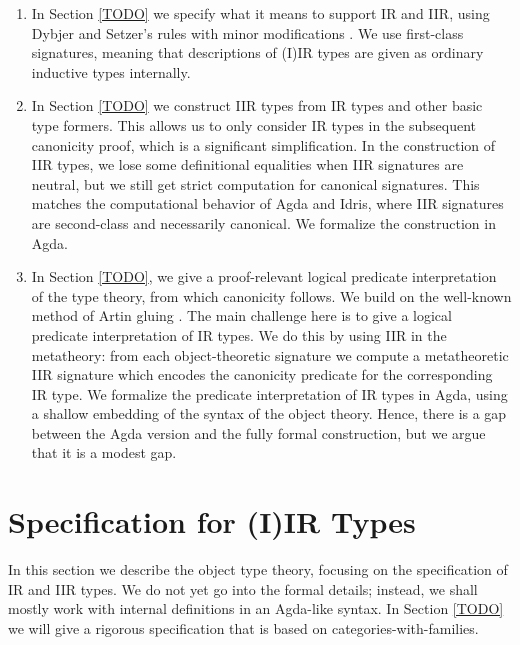 \documentclass[acmsmall,screen,review,anonymous]{acmart}
\begin{document}
\begin{enumerate}
\item In Section \ref{TODO} we specify what it means to support IR and IIR, using Dybjer and
  Setzer's rules with minor modifications \cite{TODO}. We use first-class signatures,
  meaning that descriptions of (I)IR types are given as ordinary inductive types internally.
\item In Section \ref{TODO} we construct IIR types from IR types and other basic type formers. This
  allows us to only consider IR types in the subsequent canonicity proof, which is a significant
  simplification. In the construction of IIR types, we lose some definitional equalities when IIR
  signatures are neutral, but we still get strict computation for canonical signatures. This matches
  the computational behavior of Agda and Idris, where IIR signatures are second-class and
  necessarily canonical. We formalize the construction in Agda.
\item In Section \ref{TODO}, we give a proof-relevant logical predicate interpretation of the type
  theory, from which canonicity follows. We build on the well-known method of Artin gluing
  \cite{TODO}. The main challenge here is to give a logical predicate interpretation of IR types. We
  do this by using IIR in the metatheory: from each object-theoretic signature we compute a
  metatheoretic IIR signature which encodes the canonicity predicate for the corresponding IR type.
  We formalize the predicate interpretation of IR types in Agda, using a shallow embedding of the
  syntax of the object theory. Hence, there is a gap between the Agda version and the fully formal
  construction, but we argue that it is a modest gap.
\end{enumerate}

\section{Specification for (I)IR Types}\label{sec:specification}

In this section we describe the object type theory, focusing on the specification of IR and IIR
types. We do not yet go into the formal details; instead, we shall mostly work with internal
definitions in an Agda-like syntax. In Section \ref{TODO} we will give a rigorous specification that
is based on categories-with-families.
\end{document}
